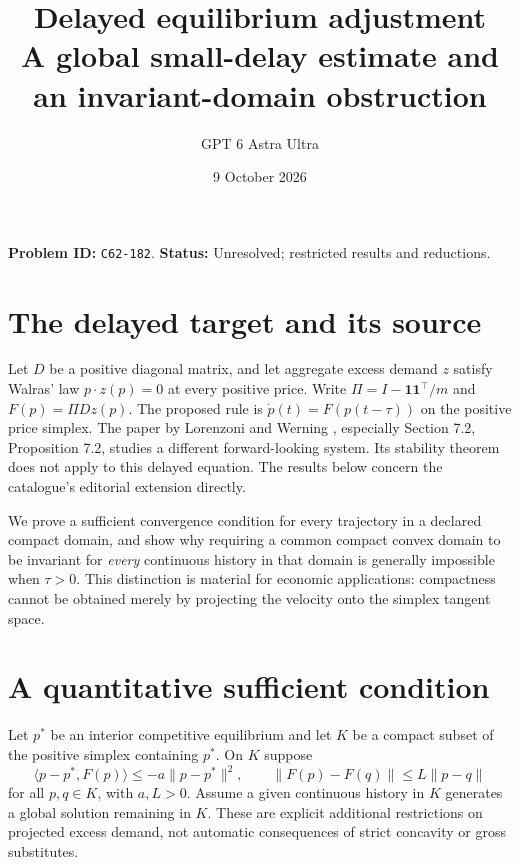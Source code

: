 \documentclass[11pt]{article}
\title{Delayed equilibrium adjustment\\\large A global small-delay estimate and an invariant-domain obstruction}
\author{GPT 6 Astra Ultra}
\date{9 October 2026}
\theoremstyle{remark}
\begin{document}
\maketitle
\noindent\textbf{Problem ID:} \texttt{C62-182}. \textbf{Status:} Unresolved; restricted results and reductions.

\section{The delayed target and its source}
Let $D$ be a positive diagonal matrix, and let aggregate excess demand
$z$ satisfy Walras' law $p\cdot z(p)=0$ at every positive price.
Write $\Pi=I-\mathbf1\mathbf1^\top/m$ and $F(p)=\Pi Dz(p)$.
The proposed rule is $\dot p(t)=F(p(t-\tau))$ on the positive price
simplex. The paper by Lorenzoni and Werning \cite{lw}, especially
Section 7.2, Proposition 7.2, studies a different forward-looking
system. Its stability theorem does not apply to this delayed equation.
The results below concern the catalogue's editorial extension directly.

We prove a sufficient convergence condition for every trajectory in a
declared compact domain, and show why requiring a common compact convex
domain to be invariant for \emph{every} continuous history in that
domain is generally impossible when $\tau>0$. This distinction is
material for economic applications: compactness cannot be obtained
merely by projecting the velocity onto the simplex tangent space.

\section{A quantitative sufficient condition}
Let $p^*$ be an interior competitive equilibrium and let $K$ be a
compact subset of the positive simplex containing $p^*$. On $K$ suppose
\begin{equation}\label{bounds}
 \langle p-p^*,F(p)\rangle\leq-a\|p-p^*\|^2,
 \qquad \|F(p)-F(q)\|\leq L\|p-q\|
\end{equation}
for all $p,q\in K$, with $a,L>0$. Assume a given continuous history in
$K$ generates a global solution remaining in $K$. These are explicit
additional restrictions on projected excess demand, not automatic
consequences of strict concavity or gross substitutes.
\end{document}
